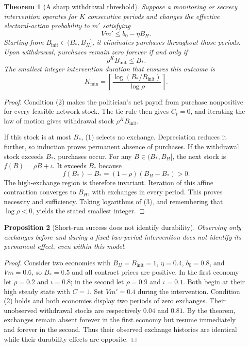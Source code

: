 \documentclass[11pt]{article}
\newtheorem{theorem}{Theorem}
\newtheorem{proposition}[theorem]{Proposition}
\theoremstyle{definition}
\begin{document}
\begin{theorem}[A sharp withdrawal threshold]
Suppose a monitoring or secrecy intervention operates for $K$ consecutive periods and changes the effective electoral-action probability to $m'$ satisfying
\[
 Vm'\leq b_0-\eta B_H.
 \tag{2}
\]
Starting from $B_{\mathrm{init}}\in(B_*,B_H]$, it eliminates purchases throughout those periods. Upon withdrawal, purchases remain zero forever if and only if
\[
 \rho^K B_{\mathrm{init}}\leq B_*.
 \tag{3}
\]
The smallest integer intervention duration that ensures this outcome is
\[
 K_{\min}=\left\lceil
 \frac{\log(B_*/B_{\mathrm{init}})}{\log\rho}
 \right\rceil.
\]
\end{theorem}
\begin{proof}
Condition (2) makes the politician's net payoff from purchase nonpositive for every feasible network stock. The tie rule then gives $C_t=0$, and iterating the law of motion gives withdrawal stock $\rho^K B_{\mathrm{init}}$.

If this stock is at most $B_*$, (1) selects no exchange. Depreciation reduces it further, so induction proves permanent absence of purchases. If the withdrawal stock exceeds $B_*$, purchases occur. For any $B\in(B_*,B_H]$, the next stock is $f(B)=\rho B+\iota$. It exceeds $B_*$ because
\[
 f(B_*)-B_*=(1-\rho)(B_H-B_*)>0.
\]
The high-exchange region is therefore invariant. Iteration of this affine contraction converges to $B_H$, with exchanges in every period. This proves necessity and sufficiency. Taking logarithms of (3), and remembering that $\log\rho<0$, yields the stated smallest integer.
\end{proof}

\begin{proposition}[Short-run success does not identify durability]
Observing only exchanges before and during a fixed two-period intervention does not identify its permanent effect, even within this model.
\end{proposition}
\begin{proof}
Consider two economies with $B_H=B_{\mathrm{init}}=1$, $\eta=0.4$, $b_0=0.8$, and $Vm=0.6$, so $B_*=0.5$ and all contract prices are positive. In the first economy let $\rho=0.2$ and $\iota=0.8$; in the second let $\rho=0.9$ and $\iota=0.1$. Both begin at their high steady state with $C=1$. Set $Vm'=0.4$ during the intervention. Condition (2) holds and both economies display two periods of zero exchanges. Their unobserved withdrawal stocks are respectively $0.04$ and $0.81$. By the theorem, exchanges remain absent forever in the first economy but resume immediately and forever in the second. Thus their observed exchange histories are identical while their durability effects are opposite.
\end{proof}
\end{document}
